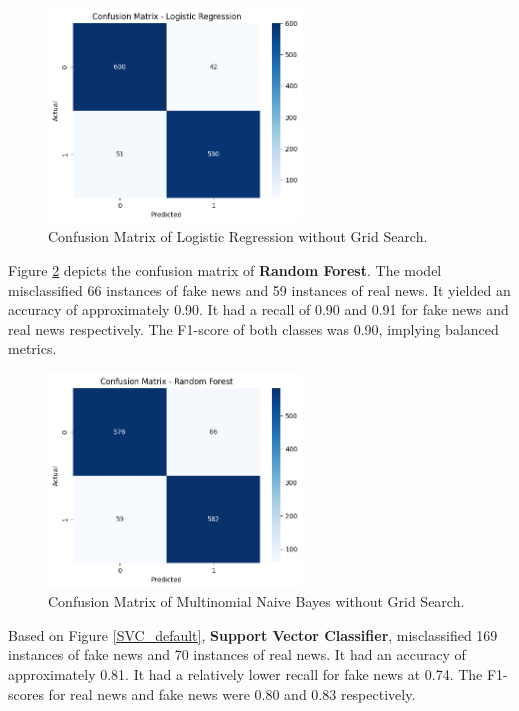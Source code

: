 \begin{figure}[h!]
    \centering
    \includegraphics[width=0.6\textwidth,height=0.6\textheight, keepaspectratio]{figures/hyperparam/LR_default.png}
        \caption{Confusion Matrix of Logistic Regression without Grid Search.}
        \label{LR_default}
\end{figure}

Figure \ref{RF_default} depicts the confusion matrix of \textbf{Random Forest}. The model misclassified 66 instances of fake news and 59 instances of real news. It yielded an accuracy of approximately 0.90. It had a recall of 0.90 and 0.91 for fake news and real news respectively. The F1-score of both classes was 0.90, implying balanced metrics.

\begin{figure}[h!]
    \centering
    \includegraphics[width=0.6\textwidth,height=0.6\textheight, keepaspectratio]{figures/hyperparam/RF_default.png}
        \caption{Confusion Matrix of Multinomial Naive Bayes without Grid Search.}
        \label{RF_default}
\end{figure}

Based on Figure \ref{SVC_default}, \textbf{Support Vector Classifier}, misclassified 169 instances of fake news and 70 instances of real news. It had an accuracy of approximately 0.81. It had a relatively lower recall for fake news at 0.74. The F1-scores for real news and fake news were 0.80 and 0.83 respectively.


